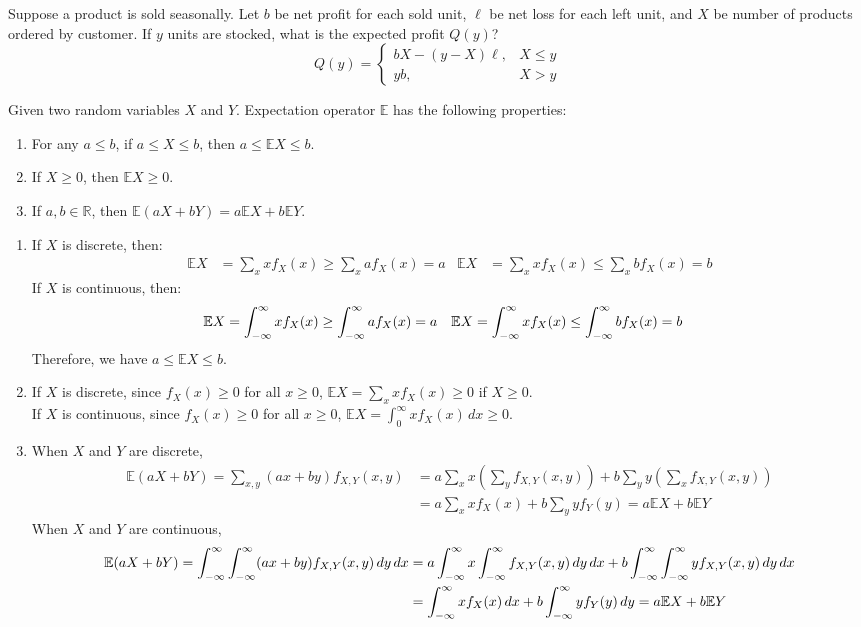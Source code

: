 \documentclass{huhtakm-template-book}
\newcommand{\expect}{\mathbb{E}}
\begin{document}
\begin{eg}
	Suppose a product is sold seasonally. Let $b$ be net profit for each sold unit, $\ell$ be net loss for each left unit, and $X$ be number of products ordered by customer. If $y$ units are stocked, what is the expected profit $Q(y)$?
	\begin{equation*}
		Q(y)=\begin{cases}
			bX-(y-X)\ell, &X\leq y\\
			yb, &X>y
		\end{cases}
	\end{equation*}
\end{eg}

\newpage
\begin{thm}
	Given two random variables $X$ and $Y$. Expectation operator $\expect$ has the following properties:
	\begin{enumerate}
		\item For any $a\leq b$, if $a\leq X\leq b$, then $a\leq\expect{X}\leq b$.
		\item If $X\geq 0$, then $\expect X\geq 0$.
		\item If $a,b\in\mathbb{R}$, then $\expect(aX+bY)=a\expect X+b\expect Y$.
	\end{enumerate}
\end{thm}
\begin{proofing}
	\begin{enumerate}
		\item If $X$ is discrete, then:
		\begin{align*}
			\expect{X}&=\sum_{x}xf_{X}(x)\geq\sum_{x}af_{X}(x)=a & \expect{X}&=\sum_{x}xf_{X}(x)\leq\sum_{x}bf_{X}(x)=b
		\end{align*}
		If $X$ is continuous, then:
		\begin{align*}
			\expect{X}&=\intinfty xf_{X}(x)\geq\intinfty af_{X}(x)=a & \expect{X}&=\intinfty xf_{X}(x)\leq\intinfty bf_{X}(x)=b
		\end{align*}
		Therefore, we have $a\leq\expect{X}\leq b$.
		\item If $X$ is discrete, since $f_{X}(x)\geq 0$ for all $x\geq 0$, $\expect{X}=\sum_{x}xf_{X}(x)\geq 0$ if $X\geq 0$.\\
		If $X$ is continuous, since $f_{X}(x)\geq 0$ for all $x\geq 0$, $\expect{X}=\int_{0}^{\infty}xf_{X}(x)\,dx\geq 0$.
		\item When $X$ and $Y$ are discrete,
		\begin{align*}
			\expect(aX+bY)=\sum_{x,y}(ax+by)f_{X,Y}(x,y)&=a\sum_{x}x\left(\sum_{y}f_{X,Y}(x,y)\right)+b\sum_{y}y\left(\sum_{x}f_{X,Y}(x,y)\right)\\
			&=a\sum_{x}xf_{X}(x)+b\sum_{y}yf_{Y}(y)=a\expect{X}+b\expect{Y}
		\end{align*}
		When $X$ and $Y$ are continuous,
		\begin{align*}
			\expect(aX+bY)=\intinfty\intinfty(ax+by)f_{X,Y}(x,y)\,dy\,dx&=a\intinfty x\intinfty f_{X,Y}(x,y)\,dy\,dx+b\intinfty\intinfty yf_{X,Y}(x,y)\,dy\,dx\\
			&=\intinfty xf_{X}(x)\,dx+b\intinfty yf_{Y}(y)\,dy=a\expect{X}+b\expect{Y}
		\end{align*}
	\end{enumerate}
\end{proofing}
\end{document}
